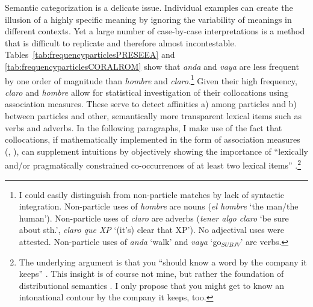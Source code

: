 Semantic categorization is a delicate issue. Individual examples can create the illusion of a highly specific meaning by ignoring the variability of meanings in different contexts. Yet a large number of case-by-case interpretations is a method that is difficult to replicate and therefore almost incontestable. Tables~\ref{tab:frequencyparticlesPRESEEA} and \ref{tab:frequencyparticlesCORALROM} show that \textit{anda} and \textit{vaya} are less frequent by one order of magnitude than \textit{hombre} and \textit{claro}.\footnote{I could easily distinguish from non-particle matches by lack of syntactic integration. Non-particle uses of \textit{hombre} are nouns (\textit{el hombre} `the man/the human'). Non-particle uses of \textit{claro} are adverbs (\textit{tener algo claro} `be sure about sth.', \textit{claro que XP} `(it's) clear that XP'). No adjectival uses were attested. Non-particle uses of \textit{anda} `walk' and \textit{vaya} `go$_{SUBJV}$' are verbs.} Given their high frequency, \textit{claro} and \textit{hombre} allow for statistical investigation of their collocations using association measures. These serve to detect affinities a) among particles and b) between particles and other, semantically more transparent lexical items such as verbs and adverbs. In the following paragraphs, I make use of the fact that collocations, if mathematically implemented in the form of association measures (\cite[75--118]{Evert.2005}, \cite{BartschEvert.2014}), can supplement intuitions by objectively showing the importance of ``lexically and/or pragmatically constrained co-occurrences of at least two lexical items'' \citep[76]{Bartsch.2004}.\footnote{The underlying argument is that you ``should know a word by the company it keeps'' \citep[11]{Firth.1957}. This insight is of course not mine, but rather the foundation of distributional semantics \citep{Lenci.2018}. I only propose that you might get to know an intonational contour by the company it keeps, too.}


